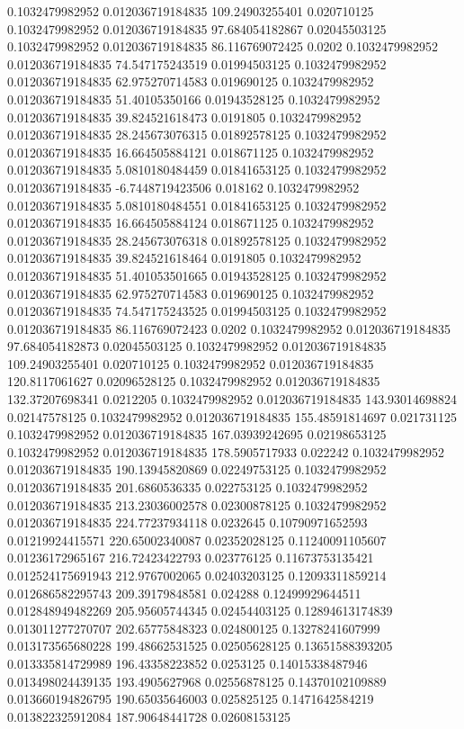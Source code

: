 0.1032479982952 0.012036719184835 109.24903255401 0.020710125
0.1032479982952 0.012036719184835 97.684054182867 0.02045503125
0.1032479982952 0.012036719184835 86.116769072425 0.0202
0.1032479982952 0.012036719184835 74.547175243519 0.01994503125
0.1032479982952 0.012036719184835 62.975270714583 0.019690125
0.1032479982952 0.012036719184835 51.40105350166 0.01943528125
0.1032479982952 0.012036719184835 39.824521618473 0.0191805
0.1032479982952 0.012036719184835 28.245673076315 0.01892578125
0.1032479982952 0.012036719184835 16.664505884121 0.018671125
0.1032479982952 0.012036719184835 5.0810180484459 0.01841653125
0.1032479982952 0.012036719184835 -6.7448719423506 0.018162
0.1032479982952 0.012036719184835 5.0810180484551 0.01841653125
0.1032479982952 0.012036719184835 16.664505884124 0.018671125
0.1032479982952 0.012036719184835 28.245673076318 0.01892578125
0.1032479982952 0.012036719184835 39.824521618464 0.0191805
0.1032479982952 0.012036719184835 51.401053501665 0.01943528125
0.1032479982952 0.012036719184835 62.975270714583 0.019690125
0.1032479982952 0.012036719184835 74.547175243525 0.01994503125
0.1032479982952 0.012036719184835 86.116769072423 0.0202
0.1032479982952 0.012036719184835 97.684054182873 0.02045503125
0.1032479982952 0.012036719184835 109.24903255401 0.020710125
0.1032479982952 0.012036719184835 120.8117061627 0.02096528125
0.1032479982952 0.012036719184835 132.37207698341 0.0212205
0.1032479982952 0.012036719184835 143.93014698824 0.02147578125
0.1032479982952 0.012036719184835 155.48591814697 0.021731125
0.1032479982952 0.012036719184835 167.03939242695 0.02198653125
0.1032479982952 0.012036719184835 178.5905717933 0.022242
0.1032479982952 0.012036719184835 190.13945820869 0.02249753125
0.1032479982952 0.012036719184835 201.6860536335 0.022753125
0.1032479982952 0.012036719184835 213.23036002578 0.02300878125
0.1032479982952 0.012036719184835 224.77237934118 0.0232645
0.10790971652593 0.01219924415571 220.65002340087 0.02352028125
0.11240091105607 0.01236172965167 216.72423422793 0.023776125
0.11673753135421 0.012524175691943 212.9767002065 0.02403203125
0.12093311859214 0.012686582295743 209.39179848581 0.024288
0.12499929644511 0.012848949482269 205.95605744345 0.02454403125
0.12894613174839 0.013011277270707 202.65775848323 0.024800125
0.13278241607999 0.013173565680228 199.48662531525 0.02505628125
0.13651588393205 0.013335814729989 196.43358223852 0.0253125
0.14015338487946 0.013498024439135 193.4905627968 0.02556878125
0.14370102109889 0.013660194826795 190.65035646003 0.025825125
0.1471642584219 0.013822325912084 187.90648441728 0.02608153125
